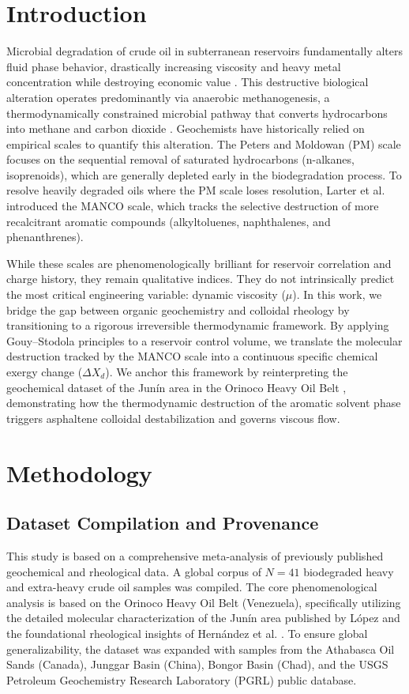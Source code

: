 \documentclass[review,12pt]{elsarticle}
\begin{document}
\section{Introduction}
Microbial degradation of crude oil in subterranean reservoirs fundamentally alters fluid phase behavior, drastically increasing viscosity and heavy metal concentration while destroying economic value \cite{head2003, peters2005}. This destructive biological alteration operates predominantly via anaerobic methanogenesis, a thermodynamically constrained microbial pathway that converts hydrocarbons into methane and carbon dioxide \cite{jones2008}. Geochemists have historically relied on empirical scales to quantify this alteration. The Peters and Moldowan (PM) scale focuses on the sequential removal of saturated hydrocarbons (n-alkanes, isoprenoids), which are generally depleted early in the biodegradation process. To resolve heavily degraded oils where the PM scale loses resolution, Larter et al. \cite{larter2012} introduced the MANCO scale, which tracks the selective destruction of more recalcitrant aromatic compounds (alkyltoluenes, naphthalenes, and phenanthrenes). 

While these scales are phenomenologically brilliant for reservoir correlation and charge history, they remain qualitative indices. They do not intrinsically predict the most critical engineering variable: dynamic viscosity ($\mu$). In this work, we bridge the gap between organic geochemistry and colloidal rheology by transitioning to a rigorous irreversible thermodynamic framework. By applying Gouy--Stodola principles to a reservoir control volume, we translate the molecular destruction tracked by the MANCO scale into a continuous specific chemical exergy change ($\Delta X_d$). We anchor this framework by reinterpreting the geochemical dataset of the Jun\'in area in the Orinoco Heavy Oil Belt \cite{lopez2014, hernandez1983}, demonstrating how the thermodynamic destruction of the aromatic solvent phase triggers asphaltene colloidal destabilization and governs viscous flow.

\section{Methodology}

\subsection{Dataset Compilation and Provenance}
This study is based on a comprehensive meta-analysis of previously published geochemical and rheological data. A global corpus of $N=41$ biodegraded heavy and extra-heavy crude oil samples was compiled. The core phenomenological analysis is based on the Orinoco Heavy Oil Belt (Venezuela), specifically utilizing the detailed molecular characterization of the Jun\'in area published by L\'opez \cite{lopez2014} and the foundational rheological insights of Hern\'andez et al. \cite{hernandez1983}. To ensure global generalizability, the dataset was expanded with samples from the Athabasca Oil Sands (Canada), Junggar Basin (China), Bongor Basin (Chad), and the USGS Petroleum Geochemistry Research Laboratory (PGRL) public database. 
\end{document}
